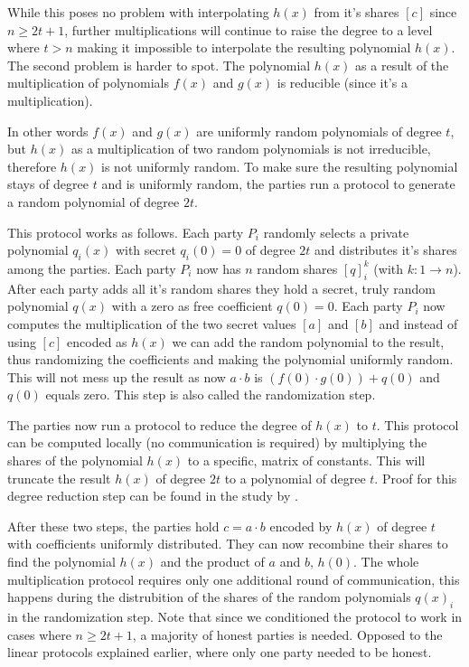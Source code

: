 While this poses no problem with interpolating $h(x)$ from it's shares $[c]$ since $n \geq 2t + 1$, further multiplications will continue to raise the degree to a level where $t>n$ making it impossible to interpolate the resulting polynomial $h(x)$. The second problem is harder to spot.
The polynomial $h(x)$ as a result of the multiplication of polynomials $f(x)$ and $g(x)$ is reducible (since it's a multiplication).

In other words $f(x)$ and $g(x)$ are uniformly random polynomials of degree $t$, but $h(x)$ as a multiplication of two random polynomials is not irreducible, therefore $h(x)$ is not uniformly random. To make sure the resulting polynomial stays of degree $t$ and is uniformly random, the parties run a protocol to generate a random polynomial of degree $2t$.

This protocol works as follows. Each party $P_i$ randomly selects a private polynomial $q_i(x)$ with secret $q_i(0) = 0$ of degree $2t$ and distributes it's shares among the parties. Each party $P_i$ now has $n$ random shares $[q]_i^k$ (with $k: 1 \rightarrow n$). After each party adds all it's random shares they hold a secret, truly random polynomial $q(x)$ with a zero as free coefficient $q(0) = 0$.
Each party $P_i$ now computes the multiplication of the two secret values $[a]$ and $[b]$ and instead of using $[c]$ encoded as $h(x)$ we can add the random polynomial to the result, thus randomizing the coefficients and making the polynomial uniformly random. This will not mess up the result as now $a \cdot b$  is $(f(0) \cdot g(0)) + q(0)$ and $q(0)$ equals zero. This step is also called the randomization step.


The parties now run a protocol to reduce the degree of $h(x)$ to $t$. This protocol can be computed locally (no communication is required) by multiplying the shares of the polynomial $h(x)$ to a specific, matrix of constants. This will truncate the result $h(x)$ of degree $2t$ to a polynomial of degree $t$. Proof for this degree reduction step can be found in the study by \cite{asharov2017full}.


After these two steps, the parties hold $c =a \cdot b$ encoded by $h(x)$ of degree $t$ with coefficients uniformly distributed. They can now recombine their shares to find the polynomial $h(x)$ and the product of $a$ and $b$, $h(0)$. The whole multiplication protocol requires only one additional round of communication, this happens during the distrubition of the shares of the random polynomials $q(x)_i$ in the randomization step. Note that since we conditioned the protocol to work in cases where $n \geq 2t + 1$, a majority of honest parties is needed. Opposed to the linear protocols explained earlier, where only one party needed to be honest.


